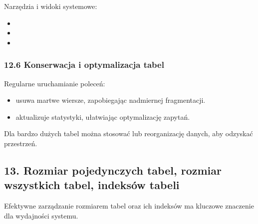 \documentclass[a4paper,11pt,openany,english]{sphinxmanual}
\begin{document}
\sphinxAtStartPar
Narzędzia i widoki systemowe:
\begin{itemize}
\item {} 
\sphinxAtStartPar
{}

\item {} 
\sphinxAtStartPar
{}

\item {} 
\sphinxAtStartPar
{}

\end{itemize}


\subsubsection{12.6 Konserwacja i optymalizacja tabel}
\label{\detokenize{rozdzial2/Konfiguracja_baz_danych/Konfiguracja_baz_danych:konserwacja-i-optymalizacja-tabel}}
\sphinxAtStartPar
Regularne uruchamianie poleceń:
\begin{itemize}
\item {} 
\sphinxAtStartPar
{} \textendash{} usuwa martwe wiersze, zapobiegając nadmiernej fragmentacji.

\item {} 
\sphinxAtStartPar
{} \textendash{} aktualizuje statystyki, ułatwiając optymalizację zapytań.

\end{itemize}

\sphinxAtStartPar
Dla bardzo dużych tabel można stosować  lub reorganizację danych, aby odzyskać przestrzeń.


\subsection{13. Rozmiar pojedynczych tabel, rozmiar wszystkich tabel, indeksów tabeli}
\label{\detokenize{rozdzial2/Konfiguracja_baz_danych/Konfiguracja_baz_danych:rozmiar-pojedynczych-tabel-rozmiar-wszystkich-tabel-indeksow-tabeli}}
\sphinxAtStartPar
Efektywne zarządzanie rozmiarem tabel oraz ich indeksów ma kluczowe znaczenie dla wydajności systemu.
\end{document}
